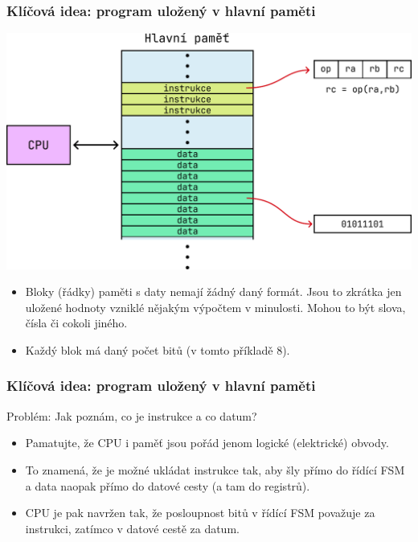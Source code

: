 \documentclass[aspectratio=169,11pt,svgnames,handout]{beamer}
\begin{document}
\begin{frame}
 \frametitle{Klíčová idea: program uložený v hlavní paměti}
 \begin{center}
  \includegraphics[width=.5\textwidth]{instructions-4.pdf}
 \end{center}
 \vspace*{-1em}
 \begin{itemize}[label=\textbullet]
  \item Bloky (řádky) paměti s daty nemají žádný daný formát. Jsou to zkrátka
   jen uložené hodnoty vzniklé nějakým výpočtem v minulosti. Mohou to být slova,
   čísla či cokoli jiného.
  \pause
  \item Každý blok má daný počet bitů (v tomto příkladě 8).
 \end{itemize}
\end{frame}

\begin{frame}
 \frametitle{Klíčová idea: program uložený v hlavní paměti}
 \alert{Problém:} Jak poznám, co je instrukce a co datum?\pause\\
 \begin{itemize}[label=\textbullet]
  \item Pamatujte, že CPU i paměť jsou pořád jenom logické (elektrické)
   obvody.\pause
  \item To znamená, že je možné ukládat instrukce tak, aby šly přímo do
   \alert{řídící FSM} a data naopak přímo do \alert{datové cesty (a tam do
   registrů)}.\pause
  \item CPU je pak navržen tak, že posloupnost bitů v řídící FSM považuje za
   instrukci, zatímco v datové cestě za datum.
 \end{itemize}
\end{frame}
\end{document}

